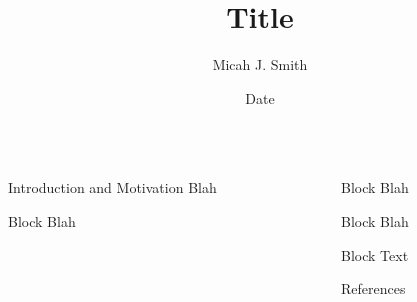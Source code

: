 \documentclass[final]{beamer}
\title[Ttl]{Title}
\author[Smith]{Micah J. Smith}
\institute[MIT]{Massachusetts Institute of Technology}
\date{Date}
\begin{document}
\begin{frame}[fragile]
\begin{columns}[T]

    \begin{column}{.47\textwidth}

            \begin{block}{Introduction and Motivation}
                Blah \cite{whitehead1912principia}
            \end{block}


            \begin{block}{Block}
                Blah
            \end{block}

    \end{column}

    \begin{column}{.47\textwidth}

            \begin{block}{Block}
                Blah
            \end{block}

            \begin{block}{Block}
                Blah
            \end{block}

            \begin{block}{Block}
                Text
            \end{block}

            \begin{block}{References}
                \footnotesize
                
                
            \end{block}

    \end{column}

\end{columns}
\end{frame}
\end{document}
